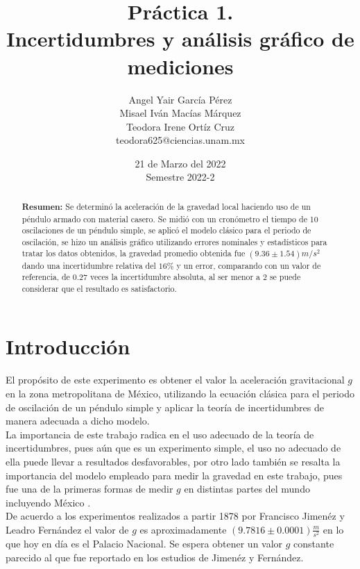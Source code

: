 \documentclass[DIV=calc, paper=a4, fontsize=11pt]{scrartcl}
\title{Práctica 1. \\ %
Incertidumbres y análisis gráfico de mediciones} %
\author{Angel Yair García Pérez \\
Misael Iván Macías Márquez\\
Teodora Irene Ortíz Cruz\\
\small{teodora625@ciencias.unam.mx}\\}
\date{21 de Marzo del 2022\\Semestre 2022-2}
\begin{document}
\maketitle
\begin{abstract}
 \textcolor{carmine}{\textbf{Resumen:}} Se determinó la aceleración de la gravedad local haciendo uso de un péndulo armado con material casero. Se midió con un cronómetro el tiempo de 10 oscilaciones de un péndulo simple, se aplicó el modelo clásico para el periodo de oscilación, se hizo un análisis gráfico utilizando errores nominales y estadísticos para tratar los datos obtenidos, la gravedad promedio obtenida fue $(9.36 \pm 1.54)m/s^2$ dando una incertidumbre relativa del $16\%$ y un error, comparando con un valor de referencia, de $0.27$ veces la incertidumbre absoluta, al ser menor a $2$ se puede considerar que el resultado es satisfactorio.
\end{abstract}
\section*{\textcolor{carmine}{Introducción}}
El propósito de este experimento es obtener el valor la aceleración gravitacional  $g$ en la zona metropolitana de México, utilizando la ecuación clásica para el periodo de oscilación de un péndulo simple y  aplicar la teoría de incertidumbres de manera adecuada a dicho modelo\cite{Manual}.\\
La importancia de este trabajo radica en el uso adecuado de la teoría  de incertidumbres, pues aún que es un experimento simple, el uso no adecuado de ella puede llevar a resultados desfavorables, por otro lado también se resalta la importancia del modelo empleado para medir la gravedad en este trabajo, pues fue una de la primeras formas de medir $g$ en distintas partes del mundo incluyendo México \cite{RevMexFis}.\\
De acuerdo a los experimentos realizados a partir 1878 por Francisco Jimenéz y Leadro Fernández  el valor de  $g$  es aproximadamente  $(9.7816\pm0.0001)\frac{m}{s^{2}}$ en lo que hoy en día es el Palacio Nacional\cite{RevMexFis}. Se espera obtener un valor $g$ constante parecido al que fue reportado en los estudios de Jimenéz y Fernández. 
\end{document}
